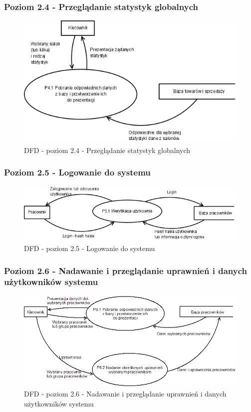 \subsubsection{Poziom 2.4 - Przeglądanie statystyk globalnych}
\begin{figure}[h]
\includegraphics[width=1\textwidth]{gfx/dfd-2-4.png}
\caption{DFD - poziom 2.4 - Przeglądanie statystyk globalnych}
\end{figure}
\clearpage
\subsubsection{Poziom 2.5 - Logowanie do systemu}
\begin{figure}[h]
\includegraphics[width=1\textwidth]{gfx/dfd-2-5.png}
\caption{DFD - poziom 2.5 - Logowanie do systemu}
\end{figure}
\clearpage
\subsubsection{Poziom 2.6 - Nadawanie i przeglądanie uprawnień i danych użytkowników systemu}
\begin{figure}[h]
\includegraphics[width=1\textwidth]{gfx/dfd-2-6.png}
\caption{DFD - poziom 2.6 - Nadawanie i przeglądanie uprawnień i danych użytkowników systemu}
\end{figure}
\clearpage
